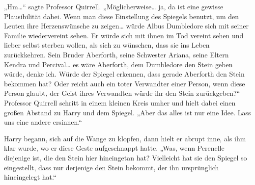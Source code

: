 „Hm…“ sagte Professor Quirrell. „Möglicherweise… ja, da ist eine gewisse Plausibilität dabei. Wenn man diese Einstellung des Spiegels benutzt, um den Leuten ihre Herzenswünsche zu zeigen… würde Albus Dumbledore sich mit seiner Familie wiedervereint sehen. Er würde sich mit ihnen im Tod vereint sehen und lieber selbst sterben wollen, als sich zu wünschen, dass sie ins Leben zurückkehren. Sein Bruder Aberforth, seine Schwester Ariana, seine Eltern Kendra und Percival… es wäre Aberforth, dem Dumbledore den Stein geben würde, denke ich. Würde der Spiegel erkennen, dass gerade Aberforth den Stein bekommen hat? Oder reicht auch ein toter Verwandter einer Person, wenn diese Person glaubt, der Geist ihres Verwandten würde ihr den Stein zurückgeben?“
Professor Quirrell schritt in einem kleinen Kreis umher und hielt dabei einen großen Abstand zu Harry und dem Spiegel.
„Aber das alles ist nur eine Idee. Lass uns eine andere ersinnen.“

Harry begann, sich auf die Wange zu klopfen, dann hielt er abrupt inne, als ihm klar wurde, wo er diese Geste aufgeschnappt hatte.
„Was, wenn Perenelle diejenige ist, die den Stein hier hineingetan hat? Vielleicht hat sie den Spiegel so eingestellt, dass nur derjenige den Stein bekommt, der ihn ursprünglich hineingelegt hat.“

